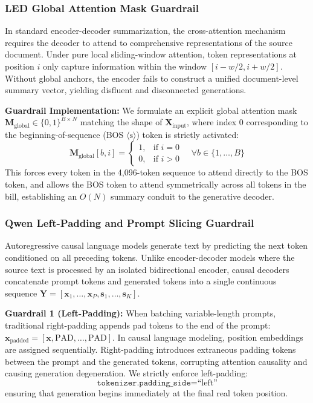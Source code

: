 \documentclass[conference]{IEEEtran}
\begin{document}
\subsubsection{LED Global Attention Mask Guardrail}
In standard encoder-decoder summarization, the cross-attention mechanism requires the decoder to attend to comprehensive representations of the source document. Under pure local sliding-window attention, token representations at position $i$ only capture information within the window $[i - w/2, i + w/2]$. Without global anchors, the encoder fails to construct a unified document-level summary vector, yielding disfluent and disconnected generations.

\textbf{Guardrail Implementation:} We formulate an explicit global attention mask $\mathbf{M}_{\text{global}} \in \{0, 1\}^{B \times N}$ matching the shape of $\mathbf{X}_{\text{input}}$, where index 0 corresponding to the beginning-of-sequence (BOS $\langle\text{s}\rangle$) token is strictly activated:
\begin{equation}
\mathbf{M}_{\text{global}}[b, i] = 
\begin{cases}
1, & \text{if } i = 0 \\
0, & \text{if } i > 0
\end{cases}
\quad \forall b \in \{1, \dots, B\}
\label{eq:led_guardrail}
\end{equation}
This forces every token in the 4,096-token sequence to attend directly to the BOS token, and allows the BOS token to attend symmetrically across all tokens in the bill, establishing an $O(N)$ summary conduit to the generative decoder.

\subsubsection{Qwen Left-Padding and Prompt Slicing Guardrail}
Autoregressive causal language models generate text by predicting the next token conditioned on all preceding tokens. Unlike encoder-decoder models where the source text is processed by an isolated bidirectional encoder, causal decoders concatenate prompt tokens and generated tokens into a single continuous sequence $\mathbf{Y} = [\mathbf{x}_1, \dots, \mathbf{x}_P, \mathbf{s}_1, \dots, \mathbf{s}_K]$.

\textbf{Guardrail 1 (Left-Padding):} When batching variable-length prompts, traditional right-padding appends pad tokens to the end of the prompt: $\mathbf{x}_{\text{padded}} = [\mathbf{x}, \text{PAD}, \dots, \text{PAD}]$. In causal language modeling, position embeddings are assigned sequentially. Right-padding introduces extraneous padding tokens between the prompt and the generated tokens, corrupting attention causality and causing generation degeneration. We strictly enforce left-padding:
\begin{equation}
\texttt{tokenizer.padding\_side} = \text{``left''}
\label{eq:left_pad}
\end{equation}
ensuring that generation begins immediately at the final real token position.
\end{document}
